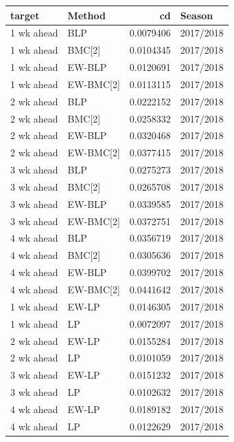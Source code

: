 \documentclass[
]{article}
\begin{document}
\begin{tabular}{l|l|r|l}
\hline
target & Method & cd & Season\\
\hline
1 wk ahead & BLP & 0.0079406 & 2017/2018\\
\hline
1 wk ahead & BMC[2] & 0.0104345 & 2017/2018\\
\hline
1 wk ahead & EW-BLP & 0.0120691 & 2017/2018\\
\hline
1 wk ahead & EW-BMC[2] & 0.0113115 & 2017/2018\\
\hline
2 wk ahead & BLP & 0.0222152 & 2017/2018\\
\hline
2 wk ahead & BMC[2] & 0.0258332 & 2017/2018\\
\hline
2 wk ahead & EW-BLP & 0.0320468 & 2017/2018\\
\hline
2 wk ahead & EW-BMC[2] & 0.0377415 & 2017/2018\\
\hline
3 wk ahead & BLP & 0.0275273 & 2017/2018\\
\hline
3 wk ahead & BMC[2] & 0.0265708 & 2017/2018\\
\hline
3 wk ahead & EW-BLP & 0.0339585 & 2017/2018\\
\hline
3 wk ahead & EW-BMC[2] & 0.0372751 & 2017/2018\\
\hline
4 wk ahead & BLP & 0.0356719 & 2017/2018\\
\hline
4 wk ahead & BMC[2] & 0.0305636 & 2017/2018\\
\hline
4 wk ahead & EW-BLP & 0.0399702 & 2017/2018\\
\hline
4 wk ahead & EW-BMC[2] & 0.0441642 & 2017/2018\\
\hline
1 wk ahead & EW-LP & 0.0146305 & 2017/2018\\
\hline
1 wk ahead & LP & 0.0072097 & 2017/2018\\
\hline
2 wk ahead & EW-LP & 0.0155284 & 2017/2018\\
\hline
2 wk ahead & LP & 0.0101059 & 2017/2018\\
\hline
3 wk ahead & EW-LP & 0.0151232 & 2017/2018\\
\hline
3 wk ahead & LP & 0.0102632 & 2017/2018\\
\hline
4 wk ahead & EW-LP & 0.0189182 & 2017/2018\\
\hline
4 wk ahead & LP & 0.0122629 & 2017/2018\\
\hline
\end{tabular}
\end{document}
